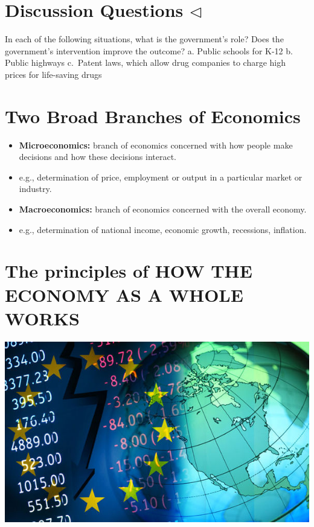 \documentclass[
]{book}
\begin{document}
\hypertarget{discussion-questions-triangleleft}{%
\section{\texorpdfstring{Discussion Questions \(\triangleleft\)}{Discussion Questions \textbackslash triangleleft}}\label{discussion-questions-triangleleft}}

In each of the following situations, what is the government's role? Does the government's intervention improve the outcome?
a. Public schools for K-12
b. Public highways
c.~Patent laws, which allow drug companies to charge high prices for life-saving drugs

\hypertarget{two-broad-branches-of-economics}{%
\section{Two Broad Branches of Economics}\label{two-broad-branches-of-economics}}

\begin{itemize}
\item
  \textbf{Microeconomics:} branch of economics concerned with how people make decisions and how these decisions interact.
\item
  e.g., determination of price, employment or output in a particular market or industry.
\item
  \textbf{Macroeconomics:} branch of economics concerned with the overall economy.
\item
  e.g., determination of national income, economic growth, recessions, inflation.
\end{itemize}

\hypertarget{the-principles-of-how-the-economy-as-a-whole-works}{%
\section{The principles of HOW THE ECONOMY AS A WHOLE WORKS}\label{the-principles-of-how-the-economy-as-a-whole-works}}

\includegraphics[width=\textwidth,height=0.99\textheight]{images/lesson01/fig3.jpg}
\end{document}
